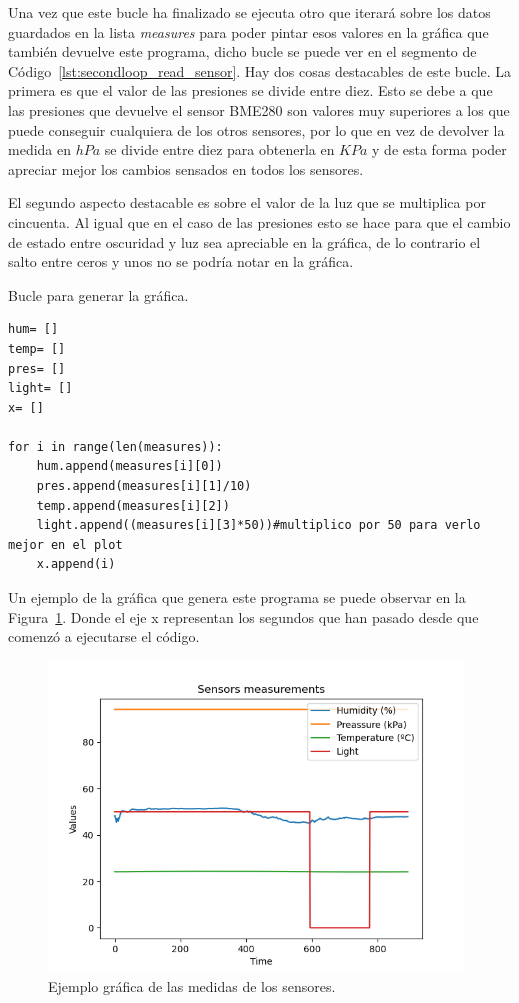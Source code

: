 \documentclass[a4paper, 12pt]{book}
\begin{document}
Una vez que este bucle ha finalizado se ejecuta otro que iterará sobre los datos guardados en la lista \textit{measures} para poder pintar esos valores en la gráfica que también devuelve este programa, dicho bucle se puede ver en el segmento de Código~\ref{lst:secondloop_read_sensor}. Hay dos cosas destacables de este bucle. La primera es que el valor de las presiones se divide entre diez. Esto se debe a que las presiones que devuelve el sensor BME280 son valores muy superiores a los que puede conseguir cualquiera de los otros sensores, por lo que en vez de devolver la medida en $hPa$ se divide entre diez para obtenerla en $KPa$ y de esta forma poder apreciar mejor los cambios sensados en todos los sensores.


El segundo aspecto destacable es sobre el valor de la luz que se multiplica por cincuenta. Al igual que en el caso de las presiones esto se hace para que el cambio de estado entre oscuridad y luz sea apreciable en la gráfica, de lo contrario el salto entre ceros y unos no se podría notar en la gráfica.

\begin{listing}[h!]
    \caption{Bucle para generar la gráfica.}{}
    \label{lst:secondloop_read_sensor}
    \begin{verbatim}
hum= []
temp= []
pres= []
light= []
x= []

for i in range(len(measures)):
    hum.append(measures[i][0])
    pres.append(measures[i][1]/10)
    temp.append(measures[i][2])
    light.append((measures[i][3]*50))#multiplico por 50 para verlo mejor en el plot
    x.append(i)
    \end{verbatim}
\end{listing}

Un ejemplo de la gráfica que genera este programa se puede observar en la Figura~\ref{fig:ejemplo_gráfica}. Donde el eje x representan los segundos que han pasado desde que comenzó a ejecutarse el código.

\begin{figure}[h!]
  \centering
  \includegraphics[width=11cm, keepaspectratio]{img/Data_graph_sensors_test3.png}
  \caption{Ejemplo gráfica de las medidas de los sensores.}\label{fig:ejemplo_gráfica}
\end{figure}
\end{document}
